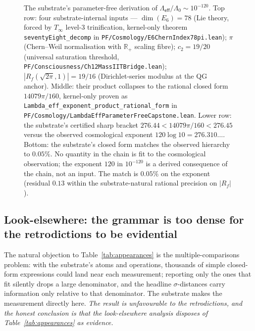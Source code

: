 \documentclass[11pt,a4paper]{amsart}
\theoremstyle{plain}
\theoremstyle{definition}
\begin{document}
\begin{figure}[h]
\caption{The substrate's parameter-free derivation of $\Lambda_{\textsf{eff}}/\Lambda_0 \sim 10^{-120}$. Top row: four substrate-internal inputs --- $\dim(E_6) = 78$ (Lie theory, forced by $T_\infty$ level-3 trinification, kernel-only theorem \texttt{seventyEight\_decomp} in \texttt{PF/Cosmology/E6ChernIndex78pi.lean}); $\pi$ (Chern--Weil normalisation with $\mathbb{R}_+$ scaling fibre); $c_2 = 19/20$ (universal saturation threshold, \texttt{PF/Consciousness/Ch12MassIITBridge.lean}); $|R_f(\sqrt{2\pi}, 1)| = 19/16$ (Dirichlet-series modulus at the QG anchor). Middle: their product collapses to the rational closed form $14079\pi/160$, kernel-only proven as \texttt{Lambda\_eff\_exponent\_product\_rational\_form} in \texttt{PF/Cosmology/LambdaEffParameterFreeCapstone.lean}. Lower row: the substrate's certified sharp bracket $276.44 < 14079\pi/160 < 276.45$ versus the observed cosmological exponent $120 \log 10 = 276.310\ldots$. Bottom: the substrate's closed form matches the observed hierarchy to $0.05\%$. No quantity in the chain is fit to the cosmological observation; the exponent $120$ in $10^{-120}$ is a derived consequence of the chain, not an input. The match is $0.05\%$ on the exponent (residual $0.13$ within the substrate-natural rational precision on $|R_f|$).}
\label{fig:lambdaeff}
\end{figure}

\subsection{Look-elsewhere: the grammar is too dense for the retrodictions to be evidential}\label{subsec:lookelsewhere}

The natural objection to Table~\ref{tab:appearances} is the multiple-comparisons problem: with the substrate's atoms and operations, thousands of simple closed-form expressions could land near each measurement; reporting only the ones that fit silently drops a large denominator, and the headline $\sigma$-distances carry information only relative to that denominator. The substrate makes the measurement directly here. \emph{The result is unfavourable to the retrodictions, and the honest conclusion is that the look-elsewhere analysis disposes of Table~\ref{tab:appearances} as evidence.}
\end{document}
